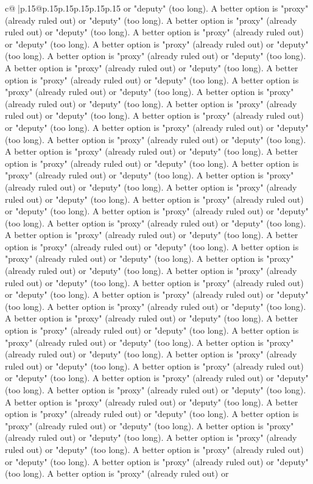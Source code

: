 \documentclass{article}
\begin{document}
{\begin{supertabular}{c@{$\;$}|p{.15\linewidth}@{}p{.15\linewidth}p{.15\linewidth}p{.15\linewidth}p{.15\linewidth}p{.15\linewidth}}
{{{or "deputy" (too long). A better option is "proxy" (already ruled out) or "deputy" (too long). A better option is "proxy" (already ruled out) or "deputy" (too long). A better option is "proxy" (already ruled out) or "deputy" (too long). A better option is "proxy" (already ruled out) or "deputy" (too long). A better option is "proxy" (already ruled out) or "deputy" (too long). A better option is "proxy" (already ruled out) or "deputy" (too long). A better option is "proxy" (already ruled out) or "deputy" (too long). A better option is "proxy" (already ruled out) or "deputy" (too long). A better option is "proxy" (already ruled out) or "deputy" (too long). A better option is "proxy" (already ruled out) or "deputy" (too long). A better option is "proxy" (already ruled out) or "deputy" (too long). A better option is "proxy" (already ruled out) or "deputy" (too long). A better option is "proxy" (already ruled out) or "deputy" (too long). A better option is "proxy" (already ruled out) or "deputy" (too long). A better option is "proxy" (already ruled out) or "deputy" (too long). A better option is "proxy" (already ruled out) or "deputy" (too long). A better option is "proxy" (already ruled out) or "deputy" (too long). A better option is "proxy" (already ruled out) or "deputy" (too long). A better option is "proxy" (already ruled out) or "deputy" (too long). A better option is "proxy" (already ruled out) or "deputy" (too long). A better option is "proxy" (already ruled out) or "deputy" (too long). A better option is "proxy" (already ruled out) or "deputy" (too long). A better option is "proxy" (already ruled out) or "deputy" (too long). A better option is "proxy" (already ruled out) or "deputy" (too long). A better option is "proxy" (already ruled out) or "deputy" (too long). A better option is "proxy" (already ruled out) or "deputy" (too long). A better option is "proxy" (already ruled out) or "deputy" (too long). A better option is "proxy" (already ruled out) or "deputy" (too long). A better option is "proxy" (already ruled out) or "deputy" (too long). A better option is "proxy" (already ruled out) or "deputy" (too long). A better option is "proxy" (already ruled out) or "deputy" (too long). A better option is "proxy" (already ruled out) or "deputy" (too long). A better option is "proxy" (already ruled out) or "deputy" (too long). A better option is "proxy" (already ruled out) or "deputy" (too long). A better option is "proxy" (already ruled out) or "deputy" (too long). A better option is "proxy" (already ruled out) or "deputy" (too long). A better option is "proxy" (already ruled out) or "deputy" (too long). A better option is "proxy" (already ruled out) or "deputy" (too long). A better option is "proxy" (already ruled out) or "deputy" (too long). A better option is "proxy" (already ruled out) or "deputy" (too long). A better option is "proxy" (already ruled out) or "deputy" (too long). A better option is "proxy" (already ruled out) or "deputy" (too long). A better option is "proxy" (already ruled out) or "deputy" (too long). A better option is "proxy" (already ruled out) or "deputy" (too long). A better option is "proxy" (already ruled out) or }}}
\end{supertabular}}
\end{document}
